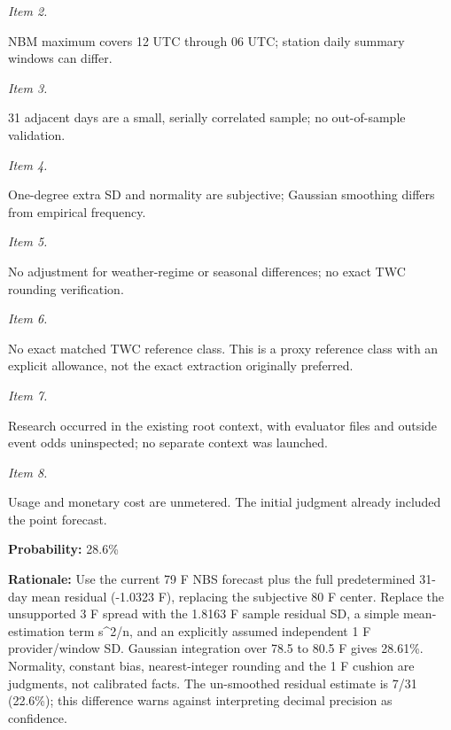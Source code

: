 \documentclass[11pt]{article}
\begin{document}
\par\noindent\textit{Item 2.}\par NBM maximum covers 12 UTC through 06 UTC; station daily summary windows can differ.

\par\noindent\textit{Item 3.}\par 31 adjacent days are a small, serially correlated sample; no out-of-sample validation.

\par\noindent\textit{Item 4.}\par One-degree extra SD and normality are subjective; Gaussian smoothing differs from empirical frequency.

\par\noindent\textit{Item 5.}\par No adjustment for weather-regime or seasonal differences; no exact TWC rounding verification.

\par\noindent\textit{Item 6.}\par No exact matched TWC reference class. This is a proxy reference class with an explicit allowance, not the exact extraction originally preferred.

\par\noindent\textit{Item 7.}\par Research occurred in the existing root context, with evaluator files and outside event odds uninspected; no separate context was launched.

\par\noindent\textit{Item 8.}\par Usage and monetary cost are unmetered. The initial judgment already included the point forecast.

\par\noindent\textbf{Probability:} 28.6\%

\par\noindent\textbf{Rationale:} Use the current 79 F NBS forecast plus the full predetermined 31-day mean residual (-1.0323 F), replacing the subjective 80 F center. Replace the unsupported 3 F spread with the 1.8163 F sample residual SD, a simple mean-estimation term s\textasciicircum{}2/n, and an explicitly assumed independent 1 F provider/window SD. Gaussian integration over 78.5 to 80.5 F gives 28.61\%. Normality, constant bias, nearest-integer rounding and the 1 F cushion are judgments, not calibrated facts. The un-smoothed residual estimate is 7/31 (22.6\%); this difference warns against interpreting decimal precision as confidence.
\end{document}
